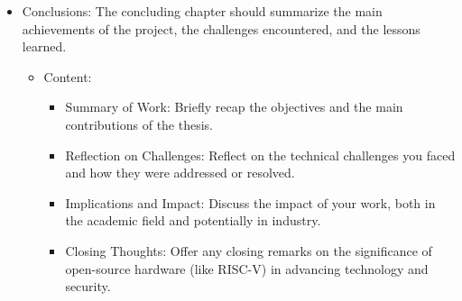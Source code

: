 \begin{itemize}
  \item Conclusions: The concluding chapter should summarize the main
    achievements of the project, the challenges encountered, and the lessons
    learned.
    \begin{itemize}
      \item Content:
        \begin{itemize}
          \item Summary of Work: Briefly recap the objectives and the main
            contributions of the thesis.

          \item Reflection on Challenges: Reflect on the technical challenges
            you faced and how they were addressed or resolved.

          \item Implications and Impact: Discuss the impact of your work, both in
            the academic field and potentially in industry.

          \item Closing Thoughts: Offer any closing remarks on the significance
            of open-source hardware (like RISC-V) in advancing technology and
            security.
        \end{itemize}
    \end{itemize}
\end{itemize}